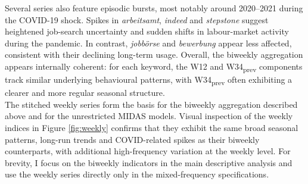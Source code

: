 \documentclass[12pt,a4paper]{article}
\begin{document}
Several series also feature episodic bursts, most notably around 2020--2021 during the COVID-19 shock. Spikes in \textit{arbeitsamt}, \textit{indeed} and \textit{stepstone} suggest heightened job-search uncertainty and sudden shifts in labour-market activity during the pandemic. In contrast, \textit{jobbörse} and \textit{bewerbung} appear less affected, consistent with their declining long-term usage.
Overall, the biweekly aggregation appears internally coherent: for each keyword, the W12 and W34\textsubscript{prev} components track similar underlying behavioural patterns, with W34\textsubscript{prev} often exhibiting a clearer and more regular seasonal structure. \\
The stitched weekly series form the basis for the biweekly aggregation described above and for the unrestricted MIDAS models. Visual inspection of the weekly indices in Figure \ref{fig:weekly} confirms that they exhibit the same broad seasonal patterns, long-run trends and COVID-related spikes as their biweekly counterparts, with additional high-frequency variation at the weekly level. For brevity, I focus on the biweekly indicators in the main descriptive analysis and use the weekly series directly only in the mixed-frequency specifications.
\end{document}
